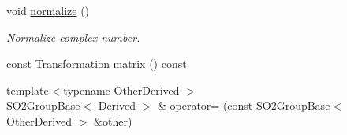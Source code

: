 \begin{DoxyCompactItemize}
void \hyperlink{class_sophus_1_1_s_o2_group_base_ab2012323b9b58e90e032ac4663225439}{normalize} ()
\begin{DoxyCompactList}\small\item\em Normalize complex number. \end{DoxyCompactList}\item 
const \hyperlink{class_sophus_1_1_s_o2_group_base_a8981dccaf65802191e989815046b6a82}{Transformation} \hyperlink{class_sophus_1_1_s_o2_group_base_a60e9726972a837a209cfcf6379ad17bf}{matrix} () const 
\item 
{\footnotesize template$<$typename Other\+Derived $>$ }\\\hyperlink{class_sophus_1_1_s_o2_group_base}{S\+O2\+Group\+Base}$<$ Derived $>$ \& \hyperlink{class_sophus_1_1_s_o2_group_base_a1fc0323f31179fb774417605b8296b3d}{operator=} (const \hyperlink{class_sophus_1_1_s_o2_group_base}{S\+O2\+Group\+Base}$<$ Other\+Derived $>$ \&other)\hypertarget{class_sophus_1_1_s_o2_group_base_a1fc0323f31179fb774417605b8296b3d}{}\label{class_sophus_1_1_s_o2_group_base_a1fc0323f31179fb774417605b8296b3d}


\end{DoxyCompactItemize}
